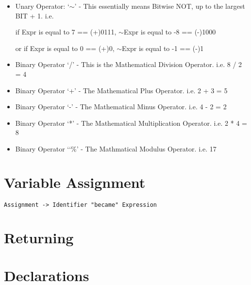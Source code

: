 \documentclass[a4wide, 11pt]{article}
\begin{document}
\begin{itemize}

\item
Unary Operator: `$\sim$' - This essentially means Bitwise NOT, up to the largest BIT + 1. i.e. 

\vspace{0.75mm} \hspace{25mm} \hspace{12mm} if Expr is equal to 7 == (+)0111, $\sim$Expr is equal to -8 == (-)1000

\vspace{0.75mm} \hspace{25mm} \hspace{12mm} or if Expr is equal to  0 == (+)0, $\sim$Expr is equal to -1 == (-)1
\item
Binary Operator `/' \hspace{2mm}- This is the Mathematical Division Operator. i.e. 8 / 2 = 4
\item
Binary Operator `+' \hspace{1mm}- The Mathematical Plus Operator. i.e. 2 + 3 = 5
\item 
Binary Operator `-'\hspace{3mm} - The Mathematical Minus Operator. i.e. 4 - 2 = 2
\item
Binary Operator `*'\hspace{2.5mm} - The Mathematical Multiplication Operator. i.e. 2 * 4 = 8
\item
Binary Operator `\char`\%'\hspace{1mm} - The Mathmatical Modulus Operator. i.e.  17 %

\end{itemize}


\section{Variable Assignment}

\begin{verbatim}
Assignment -> Identifier "became" Expression
\end{verbatim}

\section {Returning}

\section{Declarations}
\end{document}
